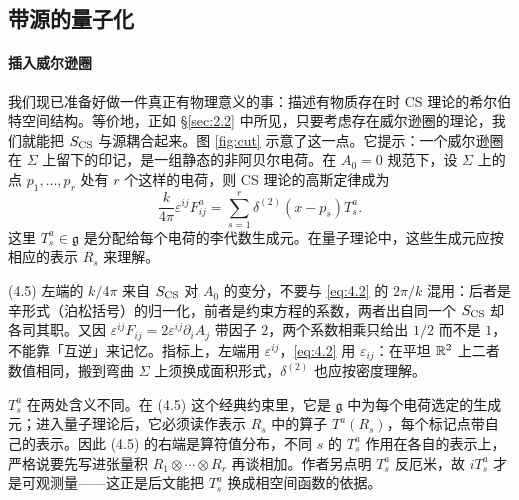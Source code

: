 \subsection{带源的量子化}\label{sec:4.2}

\paragraph{插入威尔逊圈}
我们现已准备好做一件真正有物理意义的事：描述有物质存在时 CS 理论的希尔伯特空间结构。等价地，正如 \S\ref{sec:2.2} 中所见，只要考虑存在威尔逊圈的理论，我们就能把 $S_{\mathrm{CS}}$ 与源耦合起来。图 \ref{fig:cut} 示意了这一点。它提示：一个威尔逊圈在 $\Sigma$ 上留下的印记，是一组静态的非阿贝尔电荷。在 $A_0=0$ 规范下，设 $\Sigma$ 上的点 $p_1,\dots,p_r$ 处有 $r$ 个这样的电荷，则 CS 理论的高斯定律成为
\begin{equation}\tag{4.5}\label{eq:4.5}
  \frac{k}{4\pi}\varepsilon^{ij}F^{a}_{ij} = \sum_{s=1}^{r}\delta^{(2)}(x-p_s)T^{a}_{s}.
\end{equation}
这里 $T^{a}_{s}\in\mathfrak{g}$ 是分配给每个电荷的李代数生成元。在量子理论中，这些生成元应按相应的表示 $R_s$ 来理解。

\begin{yizhu}[易错点]
(4.5) 左端的 $k/4\pi$ 来自 $S_{\mathrm{CS}}$ 对 $A_0$ 的变分，不要与 \eqref{eq:4.2} 的 $2\pi/k$ 混用：后者是辛形式（泊松括号）的归一化，前者是约束方程的系数，两者出自同一个 $S_{\mathrm{CS}}$ 却各司其职。又因 $\varepsilon^{ij}F_{ij}=2\varepsilon^{ij}\partial_iA_j$ 带因子 $2$，两个系数相乘只给出 $1/2$ 而不是 $1$，不能靠「互逆」来记忆。指标上，左端用 $\varepsilon^{ij}$，\eqref{eq:4.2} 用 $\varepsilon_{ij}$：在平坦 $\mathbb{R}^2$ 上二者数值相同，搬到弯曲 $\Sigma$ 上须换成面积形式，$\delta^{(2)}$ 也应按密度理解。
\end{yizhu}

\begin{yizhu}[易错点]
$T^{a}_{s}$ 在两处含义不同。在 (4.5) 这个经典约束里，它是 $\mathfrak{g}$ 中为每个电荷选定的生成元；进入量子理论后，它必须读作表示 $R_s$ 中的算子 $T^{a}(R_s)$，每个标记点带自己的表示。因此 (4.5) 的右端是算符值分布，不同 $s$ 的 $T^{a}_{s}$ 作用在各自的表示上，严格说要先写进张量积 $R_1\otimes\cdots\otimes R_r$ 再谈相加。作者另点明 $T^{a}_{s}$ 反厄米，故 $iT^{a}_{s}$ 才是可观测量——这正是后文能把 $T^{a}_{s}$ 换成相空间函数的依据。
\end{yizhu}

